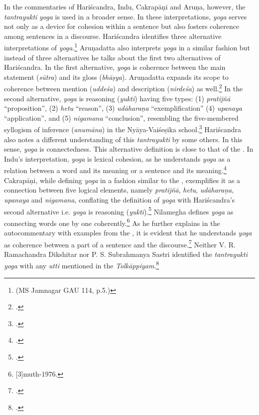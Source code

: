 In the commentaries of Hariścandra, Indu, Cakrapāṇi and Aruṇa, however, the \emph{tantrayukti} \emph{yoga} is used in a broader sense. In these interpretations, \emph{yoga} serves not only as a device for cohesion within a sentence but also fosters coherence among sentences in a discourse. Hariścandra identifies three alternative interpretations of \emph{yoga}.\footnote{ (MS Jamnagar GAU 114, p.5.)} 
Aruṇadatta also interprets \emph{yoga} in a similar fashion but instead of three alternatives he talks about the first two alternatives of Hariścandra. In the first alternative, \emph{yoga} is coherence between the main statement (\emph{sūtra}) and its gloss (\emph{bhāṣya}).
Aruṇadatta expands its scope to coherence between mention (\emph{uddeśa}) and description (\emph{nirdeśa}) as well.\footnote{ .}  
In the second alternative, \emph{yoga} is reasoning (\emph{yukti}) having five types: (1) \emph{pratijñā} “proposition”, (2) \emph{hetu} “reason”, (3) \emph{udāharaṇa} “exemplification” (4) \emph{upanaya} “application”, and (5) \emph{nigamana} “conclusion”, resembling the five-membered syllogism of inference (\emph{anumāna}) in the Nyāya-Vaiśeṣika school.\footnote{ .}  
Hariścandra also notes a different understanding of this \emph{tantrayukti} by some others. In this sense, \emph{yoga} is connectedness. This alternative definition is close to that of the \SS. In Indu's interpretation, \emph{yoga} is lexical cohesion, as he understands \emph{yoga} as a relation between a word and its meaning or a sentence and its meaning.\footnote{ .} 
Cakrapāṇi, while defining \emph{yoga} in a fashion similar to the \SS, exemplifies it as a connection between five logical elements, namely \emph{pratijñā}, \emph{hetu}, \emph{udāharaṇa}, \emph{upanaya} and \emph{nigamana}, conflating the definition of \emph{yoga} with Hariścandra's second alternative i.e. \emph{yoga} is reasoning (\emph{yukti}).\footnote{ .} 
Nīlamegha defines \emph{yoga} as connecting words one by one coherently.\footnote{ \cite{2}[3]{muth-1976}.} As he further explains in the autocommentary with examples from the \AHS, it is evident that he understands \emph{yoga} as coherence between a part of a sentence and the discourse.\footnote{\dev{/} \cite[3]{muth-1976}.} 
Neither V. R. Ramachandra Dikshitar nor P. S. Subrahmanya Sastri identified the \emph{tantrayukti} \emph{yoga} with any \emph{utti} mentioned in the \emph{Tolkāppiyam}.\footnote{\cite[84]{chev-2009}.} 

